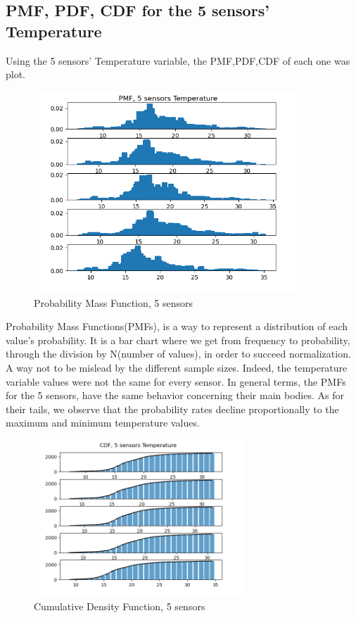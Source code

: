 \documentclass[a4paper,12pt]{article} %
\begin{document}
\subsection{PMF, PDF, CDF for the 5 sensors' Temperature}
\vspace{5mm}
Using the 5 sensors' Temperature variable, the PMF,PDF,CDF of each one was plot.
\vspace{10mm}
\begin{figure}[H]   
	\centering 
	\includegraphics[width=0.9\textwidth]{Figure_7.png}
	\caption{Probability Mass Function, 5 sensors} 
\end{figure}
\vspace{5mm}
\setlength{\parindent}{8ex} Probability Mass Functions(PMFs), is a way to represent a distribution of each value's probability. It is a bar chart where we get from frequency to probability, through the division by N(number of values), in order to succeed normalization. A way not to be mislead by the different sample sizes. Indeed, the temperature variable values were not the same for every sensor. In general terms, the PMFs for the 5 sensors, have the same behavior concerning their main bodies. As for their tails, we observe that the probability rates decline proportionally to the maximum and minimum temperature values.
\vspace{10mm}
\begin{figure}[H]   
	\centering 
	\includegraphics[width=0.7\textwidth]{Figure_9.png}
	\caption{Cumulative Density Function, 5 sensors} 
\end{figure}
\end{document}
